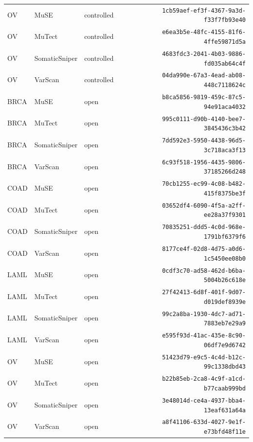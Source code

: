 \begin{table}[tbp]
\begin{subtable}{1\linewidth}
\begin{tabular}{lllr}
            OV & MuSE & controlled & \texttt{1cb59aef-ef3f-4367-9a3d-f33f7fb93e40} \\
            OV & MuTect & controlled & \texttt{e6ea3b5e-48fc-4155-81f6-4ffe59871d5a} \\
            OV & SomaticSniper & controlled & \texttt{4683fdc3-2041-4b03-9886-fd035ab64c4f} \\
            OV & VarScan & controlled & \texttt{04da990e-67a3-4ead-ab08-448c7118624c} \\
            BRCA & MuSE & open & \texttt{b8ca5856-9819-459c-87c5-94e91aca4032} \\
            BRCA & MuTect & open & \texttt{995c0111-d90b-4140-bee7-3845436c3b42} \\
            BRCA & SomaticSniper & open & \texttt{7dd592e3-5950-4438-96d5-3c718aca3f13} \\
            BRCA & VarScan & open & \texttt{6c93f518-1956-4435-9806-37185266d248} \\
            COAD & MuSE & open & \texttt{70cb1255-ec99-4c08-b482-415f8375be3f} \\
            COAD & MuTect & open & \texttt{03652df4-6090-4f5a-a2ff-ee28a37f9301} \\
            COAD & SomaticSniper & open & \texttt{70835251-ddd5-4c0d-968e-1791bf6379f6} \\
            COAD & VarScan & open & \texttt{8177ce4f-02d8-4d75-a0d6-1c5450ee08b0} \\
            LAML & MuSE & open & \texttt{0cdf3c70-ad58-462d-b6ba-5004b26c618e} \\
            LAML & MuTect & open & \texttt{27f42413-6d8f-401f-9d07-d019def8939e} \\
            LAML & SomaticSniper & open & \texttt{99c2a8ba-1930-4dc7-ad71-7883eb7e29a9} \\
            LAML & VarScan & open & \texttt{e595f93d-41ac-435e-8c90-06df7e9d6742} \\
            OV & MuSE & open & \texttt{51423d79-e9c5-4c4d-b12c-99c1338dbd43} \\
            OV & MuTect & open & \texttt{b22b85eb-2ca8-4c9f-a1cd-b77caab999bd} \\
            OV & SomaticSniper & open & \texttt{3e48014d-ce4a-4937-bba4-13eaf631a64a} \\
            OV & VarScan & open & \texttt{a8f41106-633d-4027-9e1f-e73bfd48f11e} \\
        \bottomrule
        \end{tabular}
    \end{subtable}


\end{table}
